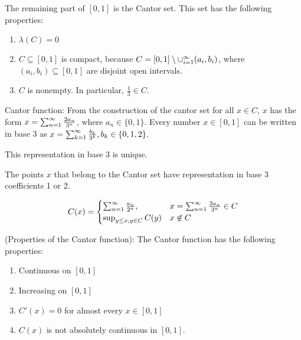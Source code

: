 \documentclass[x11names,reqno,14pt]{extarticle}
\newcommand{\seq}[2][\oo]{_{#2 = 1}^#1}
\newcommand{\cupi}[1][\oo]{\cup\seq[#1]{i}}
\begin{document}
The remaining part of $[0,1]$ is the Cantor set. This set has the following properties:

\begin{enumerate}

\item $\lambda(C) = 0$

\item $C \subseteq [0, 1]$ is compact, because $C = [0,1]\setminus\cupi(a_i, b_i)$, where $(a_i,b_i) \subseteq [0, 1]$ are disjoint open intervals. 

\item $C$ is nonempty. In particular, $\frac{1}{3}\in C$.

\end{enumerate}

Cantor function: From the construction of the cantor set for all $x \in C$, $x$ has the form $x = \sum\seq{n}\frac{2a_n}{3^n}$, where $a_n \in \{0,1\}$. Every number $x \in [0, 1]$ can be written in base 3 as $x = \sum\seq{k}\frac{b_k}{3^k}, b_k \in \{0,1,2\}.$

This representation in base 3 is unique. 

The points $x$ that belong to the Cantor set have representation in base 3 coefficients 1 or 2.

\[
C(x) = \begin{cases} \sum\seq{n} \frac{a_n}{2^n}, & x = \sum\seq{n}\frac{2a_n}{3^n} \in C \\ \sup_{y\leq x, y \in C}C(y) & x \not\in C \\ \end{cases}
\]

\thm (Properties of the Cantor function): The Cantor function has the following properties:

\begin{enumerate}

\item Continuous on $[0,1]$

\item Increasing on $[0,1]$

\item $C'(x) = 0$ for almost every $x \in [0, 1]$

\item $C(x)$ is not absolutely continuous in $[0,1]$.

\end{enumerate}

\proof\,
\end{document}
